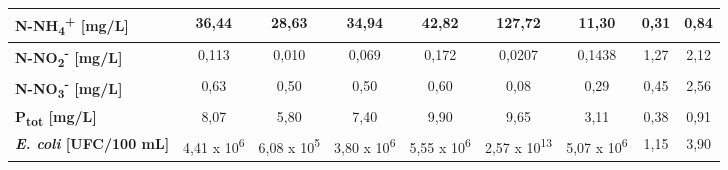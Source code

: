 \begin{sidewaystable}[h]
\begin{center}
\begin{tabular}{l|c|c|c|c|c|c|c|c|}
		\multicolumn{1}{|l|}{\textbf{N-NH\textsubscript{4}\textsuperscript{+} {[}mg/L{]}}}        & 36,44          & 28,63                   & 34,94            & 42,82                   & 127,72       & 11,30      & 0,31        & 0,84           \\ \hline
		\multicolumn{1}{|l|}{\textbf{N-NO\textsubscript{2}\textsuperscript{-} {[}mg/L{]}}}        & 0,113          & 0,010                   & 0,069            & 0,172                   & 0,0207       & 0,1438     & 1,27        & 2,12           \\ \hline
		\multicolumn{1}{|l|}{\textbf{N-NO\textsubscript{3}\textsuperscript{-} {[}mg/L{]}}}        & 0,63           & 0,50                    & 0,50             & 0,60                    & 0,08         & 0,29       & 0,45        & 2,56           \\ \hline
		\multicolumn{1}{|l|}{\textbf{P\textsubscript{tot} {[}mg/L{]}}}          & 8,07           & 5,80                    & 7,40             & 9,90                    & 9,65         & 3,11       & 0,38        & 0,91           \\ \hline
		\multicolumn{1}{|l|}{\textbf{\textit{E. coli} {[}UFC/100 mL{]}}} & 4,41 x 10\textsuperscript{6}     & 6,08 x 10\textsuperscript{5}              & 3,80 x 10\textsuperscript{6}       & 5,55 x 10\textsuperscript{6}              & 2,57 x 10\textsuperscript{13}  & 5,07 x 10\textsuperscript{6} & 1,15        & 3,90           \\ \hline
	

\end{tabular}
\end{center}
\end{sidewaystable}
